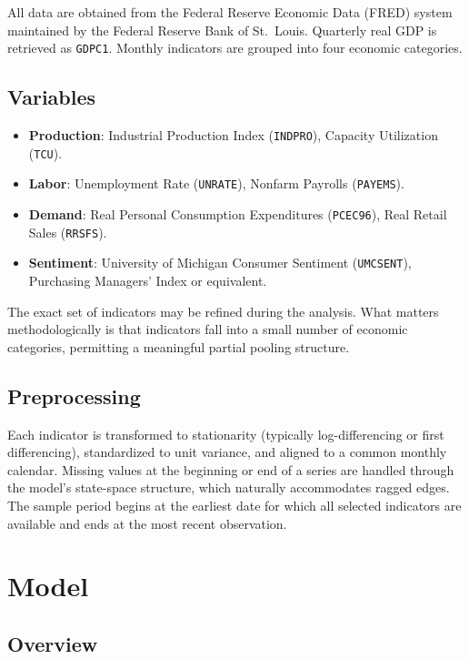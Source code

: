 \documentclass[11pt]{article}
\begin{document}
All data are obtained from the Federal Reserve Economic Data (FRED) system maintained by the Federal Reserve Bank of St.\ Louis. Quarterly real GDP is retrieved as \texttt{GDPC1}. Monthly indicators are grouped into four economic categories.

\subsection{Variables}

\begin{itemize}[nosep]
  \item \textbf{Production}: Industrial Production Index (\texttt{INDPRO}), Capacity Utilization (\texttt{TCU}).
  \item \textbf{Labor}: Unemployment Rate (\texttt{UNRATE}), Nonfarm Payrolls (\texttt{PAYEMS}).
  \item \textbf{Demand}: Real Personal Consumption Expenditures (\texttt{PCEC96}), Real Retail Sales (\texttt{RRSFS}).
  \item \textbf{Sentiment}: University of Michigan Consumer Sentiment (\texttt{UMCSENT}), Purchasing Managers' Index or equivalent.
\end{itemize}

The exact set of indicators may be refined during the analysis. What matters methodologically is that indicators fall into a small number of economic categories, permitting a meaningful partial pooling structure.

\subsection{Preprocessing}

Each indicator is transformed to stationarity (typically log-differencing or first differencing), standardized to unit variance, and aligned to a common monthly calendar. Missing values at the beginning or end of a series are handled through the model's state-space structure, which naturally accommodates ragged edges. The sample period begins at the earliest date for which all selected indicators are available and ends at the most recent observation.

\section{Model}

\subsection{Overview}
\end{document}
